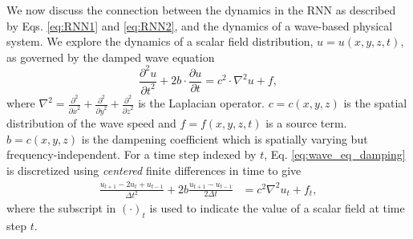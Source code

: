 We now discuss the connection between the dynamics in the RNN as described by Eqs. \ref{eq:RNN1} and \ref{eq:RNN2}, and the dynamics of a wave-based physical system.
We explore the dynamics of a scalar field distribution, $u = u{\left(x,y,z,t\right)}$, as governed by the damped wave equation \cite{elmore_physics_2012}
%
\begin{equation}
    \frac{\partial^2{u}}{{\partial{t}}^2} +  2 b \cdot \frac{\partial{u}}{{\partial{t}}} = c^2 \cdot \nabla^2 u + f,
    \label{eq:wave_eq_damping}
\end{equation}
where $\nabla^2 = \frac{\partial^2}{{\partial{x}}^2} + \frac{\partial^2}{{\partial{y}}^2} + \frac{\partial^2}{{\partial{z}}^2}$ is the Laplacian operator.
$c = c{\left(x,y,z\right)}$ is the spatial distribution of the wave speed and $f = f{\left(x,y,z,t\right)}$ is a source term.  
$b = c{\left(x,y,z\right)}$ is the dampening coefficient which is spatially varying but frequency-independent.
For a time step indexed by $t$, Eq. \ref{eq:wave_eq_damping} is discretized using \textit{centered} finite differences in time to give
\begin{align}
    \frac{u_{t+1} - 2u_t + u_{t-1}}{\Delta{t}^2} + 2b \frac{u_{t+1}-u_{t-1}}{2\Delta{t}} &= c^2 \nabla^2 u_t + f_t,
    \label{eq:wave_eq_damping_discretized}
\end{align}
where the subscript in $(\cdot)_t$ is used to indicate the value of a scalar field at time step $t$.

